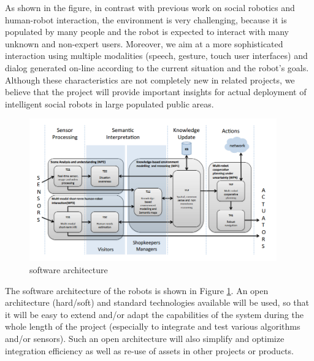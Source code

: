 As shown in the figure, in contrast with previous work on social robotics and human-robot interaction, the {\coaches} environment is very challenging, because it is populated by many people and the robot is expected to interact with many unknown and non-expert users.
Moreover, we aim at a more sophisticated interaction using multiple modalities (speech, gesture, touch user interfaces) and dialog generated on-line according to the current situation
and the robot's goals.
Although these characteristics are not completely new in related projects, we believe that the 
{\coaches} 
project  will provide important insights for actual deployment of intelligent social robots in large populated public areas. 



\begin{figure}[t!]
\centering
\includegraphics[width=0.95\textwidth]{fig/COACHES_swarch.png}
\caption{\coaches software architecture}
\label{fig:swarch}
\end{figure}

The software architecture of the {\coaches} robots is shown in Figure \ref{fig:swarch}.
An open architecture (hard/soft) and standard technologies available will be used, 
so that it will be easy to extend and/or adapt the capabilities of the system during the whole length of 
the  project  (especially  to  integrate  and  test  various  algorithms  and/or  sensors).  
Such an open architecture will also simplify and optimize integration efficiency as well as re-use of assets in other projects or products. 


